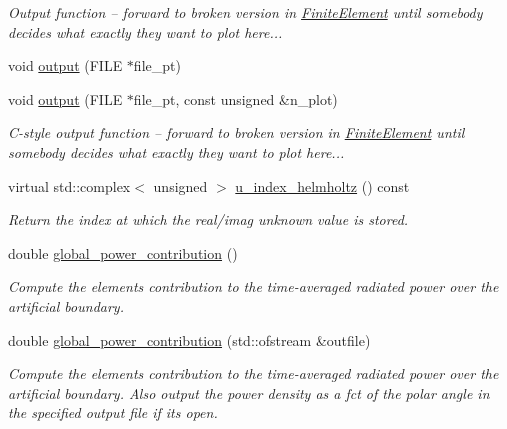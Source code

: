 \begin{DoxyCompactItemize}
\begin{DoxyCompactList}\small\item\em Output function -- forward to broken version in \hyperlink{classoomph_1_1FiniteElement}{Finite\+Element} until somebody decides what exactly they want to plot here... \end{DoxyCompactList}\item 
void \hyperlink{classoomph_1_1HelmholtzBCElementBase_a6dbcc0b0a81ab422f6a45f4d4a63d9a3}{output} (F\+I\+LE $\ast$file\+\_\+pt)
\item 
void \hyperlink{classoomph_1_1HelmholtzBCElementBase_ac521eae27bbc9dbd72c788ecfe59f4cc}{output} (F\+I\+LE $\ast$file\+\_\+pt, const unsigned \&n\+\_\+plot)
\begin{DoxyCompactList}\small\item\em C-\/style output function -- forward to broken version in \hyperlink{classoomph_1_1FiniteElement}{Finite\+Element} until somebody decides what exactly they want to plot here... \end{DoxyCompactList}\item 
virtual std\+::complex$<$ unsigned $>$ \hyperlink{classoomph_1_1HelmholtzBCElementBase_a756997c0a98903754b30fed24c92091a}{u\+\_\+index\+\_\+helmholtz} () const
\begin{DoxyCompactList}\small\item\em Return the index at which the real/imag unknown value is stored. \end{DoxyCompactList}\item 
double \hyperlink{classoomph_1_1HelmholtzBCElementBase_a32688fe93c7350d93b90ee0a81add3e5}{global\+\_\+power\+\_\+contribution} ()
\begin{DoxyCompactList}\small\item\em Compute the element\textquotesingle{}s contribution to the time-\/averaged radiated power over the artificial boundary. \end{DoxyCompactList}\item 
double \hyperlink{classoomph_1_1HelmholtzBCElementBase_a406cb34eb2852b9507cca4f97b3002bc}{global\+\_\+power\+\_\+contribution} (std\+::ofstream \&outfile)
\begin{DoxyCompactList}\small\item\em Compute the element\textquotesingle{}s contribution to the time-\/averaged radiated power over the artificial boundary. Also output the power density as a fct of the polar angle in the specified output file if it\textquotesingle{}s open. \end{DoxyCompactList}\item 

\end{DoxyCompactItemize}
